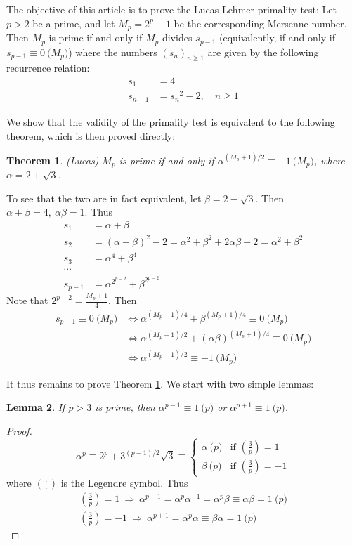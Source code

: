 \documentclass[12pt]{article}
\newcommand{\Leg}[2]{\left(\frac{#1}{#2}\right)}
\newtheorem{thm}{Theorem}
\newtheorem{lem}[thm]{Lemma}
\begin{document}
The objective of this article is to prove the Lucas-Lehmer primality test:
\newline
Let $p>2$ be a prime, and let $M_p=2^p-1$ be the corresponding Mersenne number. Then $M_p$ is prime if and only if $M_p$ divides $s_{p-1}$ (equivalently, if and only if $s_{p-1}\equiv 0\pod {M_p}$) where the numbers $(s_n)_{n\geq1}$ are given by the following recurrence relation: 
\begin{align*}
  s_1 &= 4 \\
  s_{n+1} &= {s_n}^2-2,\quad n\geq 1
\end{align*}

We show that the validity of the primality test is equivalent to the following theorem, which is then proved directly:
\begin{thm} \label{thm:one}(Lucas) $M_p$ is prime if and only if $\alpha^{(M_p+1)/2}\equiv -1\pod{M_p}$, where $\alpha = 2+\sqrt{3}$.
\end{thm}

To see that the two are in fact equivalent, let $\beta=2-\sqrt{3}$. Then $\alpha+\beta=4,\ \alpha\beta=1$. Thus
\begin{align*}
  s_1 &= \alpha+\beta\\
  s_2 &= (\alpha+\beta)^2 - 2 = \alpha^2 + \beta^2 + 2\alpha\beta-2 = \alpha^2+\beta^2\\
  s_3 &= \alpha^4 + \beta^4\\
  \cdots &\\
  s_{p-1} &= \alpha^{2^{p-2}}+\beta^{2^{p-2}}
\end{align*}
Note that $2^{p-2} = \frac{M_p+1}{4}$. Then
\begin{align*}
  s_{p-1}\equiv 0\pod{M_p} & \iff \alpha^{(M_p+1)/4}+\beta^{(M_p+1)/4} \equiv 0\pod {M_p}\\
    &\iff \alpha^{(M_p+1)/2}+(\alpha\beta)^{(M_p+1)/4} \equiv 0\pod {M_p}\\
    &\iff \alpha^{(M_p+1)/2}\equiv -1\pod {M_p}
\end{align*}

It thus remains to prove Theorem \ref{thm:one}. We start with two simple lemmas:
\begin{lem} \label{lem:two}If $p>3$ is prime, then $\alpha^{p-1}\equiv 1\pod p$ or $\alpha^{p+1}\equiv 1\pod p$.
\end{lem}
\begin{proof}
\[
  \alpha^p \equiv 2^p + 3^{(p-1)/2}\sqrt{3} \equiv \begin{cases}\alpha\pod p & \text{if }\Leg{3}{p}=1\\
  \beta \pod p & \text{if }\Leg{3}{p}=-1\end{cases}
\]
where $\Leg{\cdot}{\cdot}$ is the Legendre symbol. Thus
\begin{gather*}
    \Leg{3}{p} = 1 \ \Rightarrow\ \alpha^{p-1} = \alpha^p\alpha^{-1}
      = \alpha^p\beta \equiv \alpha\beta = 1\pod p\\
  \Leg{3}{p} = -1 \ \Rightarrow\ \alpha^{p+1} = \alpha^p\alpha \equiv \beta\alpha = 1\pod p
\end{gather*}
\end{proof}
\end{document}
